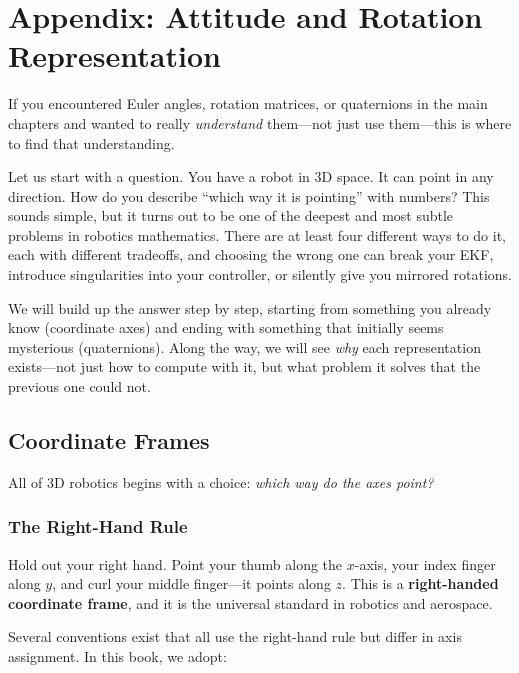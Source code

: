 \section{Appendix: Attitude and Rotation Representation}

If you encountered Euler angles, rotation matrices, or quaternions in the main chapters and wanted to really \textit{understand} them---not just use them---this is where to find that understanding.

Let us start with a question. You have a robot in 3D space. It can point in any direction. How do you describe ``which way it is pointing'' with numbers? This sounds simple, but it turns out to be one of the deepest and most subtle problems in robotics mathematics. There are at least four different ways to do it, each with different tradeoffs, and choosing the wrong one can break your EKF, introduce singularities into your controller, or silently give you mirrored rotations.

We will build up the answer step by step, starting from something you already know (coordinate axes) and ending with something that initially seems mysterious (quaternions). Along the way, we will see \textit{why} each representation exists---not just how to compute with it, but what problem it solves that the previous one could not.

\subsection{Coordinate Frames}

All of 3D robotics begins with a choice: \textit{which way do the axes point?}

\subsubsection{The Right-Hand Rule}

Hold out your right hand. Point your thumb along the $x$-axis, your index finger along $y$, and curl your middle finger---it points along $z$. This is a \textbf{right-handed coordinate frame}, and it is the universal standard in robotics and aerospace.

Several conventions exist that all use the right-hand rule but differ in axis assignment. In this book, we adopt:

